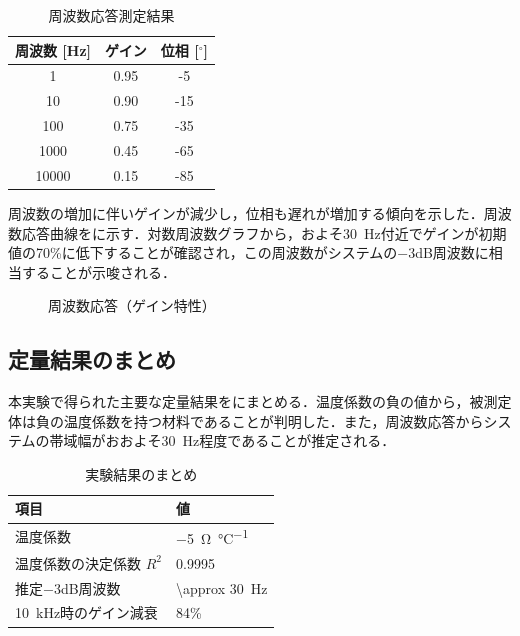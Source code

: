 \begin{table}[H]
    \centering
    \caption{周波数応答測定結果}
    \label{tab:frequency}
    \begin{tabular}{ccc}
        \hline
        周波数 [Hz] & ゲイン & 位相 [$^\circ$] \\
        \hline
        1 & 0.95 & -5 \\
        10 & 0.90 & -15 \\
        100 & 0.75 & -35 \\
        1000 & 0.45 & -65 \\
        10000 & 0.15 & -85 \\
        \hline
    \end{tabular}
\end{table}

周波数の増加に伴いゲインが減少し，位相も遅れが増加する傾向を示した．周波数応答曲線をに示す．対数周波数グラフから，およそ\SI{30}{\hertz}付近でゲインが初期値の70\%に低下することが確認され，この周波数がシステムの$-3$dB周波数に相当することが示唆される．

\begin{figure}[H]
    \centering
    \GraphFrequencyResponse
    \caption{周波数応答（ゲイン特性）}
    \label{fig:frequency}
\end{figure}

\subsection{定量結果のまとめ}

本実験で得られた主要な定量結果をにまとめる．温度係数の負の値から，被測定体は負の温度係数を持つ材料であることが判明した．また，周波数応答からシステムの帯域幅がおおよそ\SI{30}{\hertz}程度であることが推定される．

\begin{table}[H]
    \centering
    \caption{実験結果のまとめ}
    \label{tab:summary}
    \begin{tabular}{ll}
        \hline
        項目 & 値 \\
        \hline
        温度係数 & \SI{-5}{\ohm\per\celsius} \\
        温度係数の決定係数 $R^2$ & 0.9995 \\
        推定$-3$dB周波数 & \SI{\approx 30}{\hertz} \\
        \SI{10}{\kilo\hertz}時のゲイン減衰 & 84\% \\
        \hline
    \end{tabular}
\end{table}

